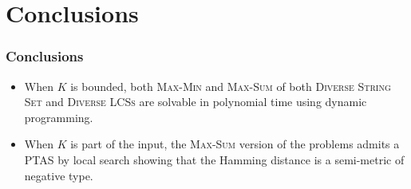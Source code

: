 \documentclass{beamer}
\begin{document}
\section{Conclusions}
\begin{frame}
    \frametitle{Conclusions}
    \begin{itemize}
        \item When $K$ is bounded, both \textsc{Max-Min} and \textsc{Max-Sum} of both \textsc{Diverse String Set} and \textsc{Diverse LCSs} are solvable in polynomial time using dynamic programming.
        \item When $K$ is part of the input, the \textsc{Max-Sum} version of the problems admits a PTAS by local search showing that the Hamming distance is a semi-metric of negative type.
    \end{itemize}
\end{frame}





\end{document}
